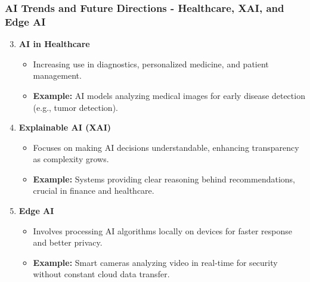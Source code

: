 \documentclass[aspectratio=169]{beamer}
\begin{document}
\begin{frame}[fragile]
    \frametitle{AI Trends and Future Directions - Healthcare, XAI, and Edge AI}
    \begin{enumerate}
        \setcounter{enumi}{2}
        \item \textbf{AI in Healthcare}  
        \begin{itemize}
            \item Increasing use in diagnostics, personalized medicine, and patient management.
            \item \textbf{Example:} AI models analyzing medical images for early disease detection (e.g., tumor detection).
        \end{itemize}

        \item \textbf{Explainable AI (XAI)}  
        \begin{itemize}
            \item Focuses on making AI decisions understandable, enhancing transparency as complexity grows.
            \item \textbf{Example:} Systems providing clear reasoning behind recommendations, crucial in finance and healthcare.
        \end{itemize}

        \item \textbf{Edge AI}  
        \begin{itemize}
            \item Involves processing AI algorithms locally on devices for faster response and better privacy.
            \item \textbf{Example:} Smart cameras analyzing video in real-time for security without constant cloud data transfer.
        \end{itemize}
    \end{enumerate}
\end{frame}
\end{document}
